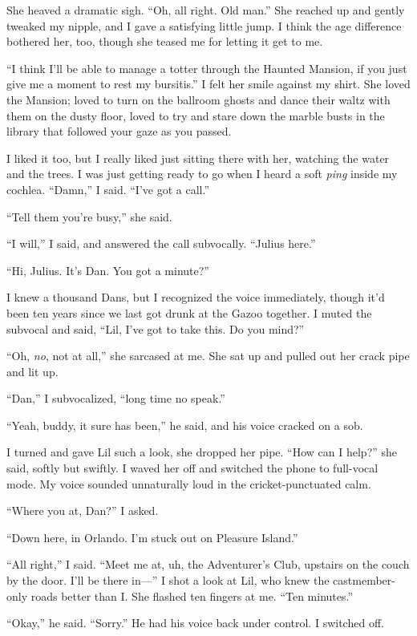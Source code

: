She heaved a dramatic sigh. “Oh, all right. Old man.” She reached
up and gently tweaked my nipple, and I gave a satisfying little
jump. I think the age difference bothered her, too, though she
teased me for letting it get to me.

“I think I'll be able to manage a totter through the Haunted
Mansion, if you just give me a moment to rest my bursitis.” I felt
her smile against my shirt. She loved the Mansion; loved to turn on
the ballroom ghosts and dance their waltz with them on the dusty
floor, loved to try and stare down the marble busts in the library
that followed your gaze as you passed.

I liked it too, but I really liked just sitting there with her,
watching the water and the trees. I was just getting ready to go
when I heard a soft \emph{ping} inside my cochlea. “Damn,” I said.
“I've got a call.”

“Tell them you're busy,” she said.

“I will,” I said, and answered the call subvocally. “Julius here.”

“Hi, Julius. It's Dan. You got a minute?”

I knew a thousand Dans, but I recognized the voice immediately,
though it'd been ten years since we last got drunk at the Gazoo
together. I muted the subvocal and said, “Lil, I've got to take
this. Do you mind?”

“Oh, \emph{no}, not at all,” she sarcased at me. She sat up and
pulled out her crack pipe and lit up.

“Dan,” I subvocalized, “long time no speak.”

“Yeah, buddy, it sure has been,” he said, and his voice cracked on
a sob.

I turned and gave Lil such a look, she dropped her pipe. “How can I
help?” she said, softly but swiftly. I waved her off and switched
the phone to full-vocal mode. My voice sounded unnaturally loud in
the cricket-punctuated calm.

“Where you at, Dan?” I asked.

“Down here, in Orlando. I'm stuck out on Pleasure Island.”

“All right,” I said. “Meet me at, uh, the Adventurer's Club,
upstairs on the couch by the door. I'll be there in—” I shot a look
at Lil, who knew the castmember-only roads better than I. She
flashed ten fingers at me. “Ten minutes.”

“Okay,” he said. “Sorry.” He had his voice back under control. I
switched off.

